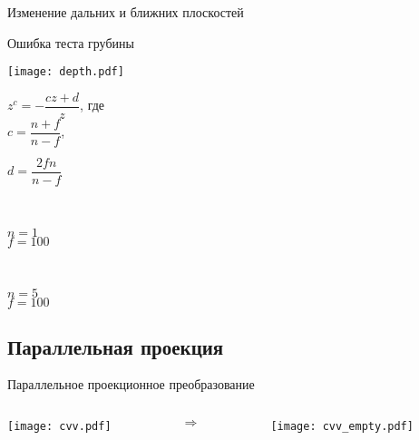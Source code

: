 \documentclass[10pt]{beamer}
\begin{document}
	\begin{frame}{Изменение дальних и ближних плоскостей}
		\centering{}
		
	\end{frame}
	
	\begin{frame}{Ошибка теста грубины}
			
		{
		
			\texttt{[image: depth.pdf]}

		}{
		
		        $z^c = -\dfrac{cz+d}{z}$, где \\[0.3ex] 
		        
		        $c = \dfrac{n+f}{n-f}$,
		        
		        $d = \dfrac{2fn}{n-f}$
		        
		        ~
				
				{ \color{red} $n=1$\\$f=100$   }
				
				~
				
				{ \color{blue} $n=5$\\$f=100$   }
	
		}
		
	\end{frame}
	
	\subsection{Параллельная проекция}
	
	\begin{frame}{Параллельное проекционное преобразование}
		\centering
		\begin{columns}
			\begin{column}{0.6\textwidth}
				\texttt{[image: cvv.pdf]}
			\end{column}
			
			\begin{column}{0.1\textwidth}
				\centering
				$\Rightarrow$
			\end{column}
			
			\begin{column}{0.3\textwidth}
				\centering
				\texttt{[image: cvv\_empty.pdf]}
			\end{column}
		\end{columns}
	\end{frame}
	
\end{document}
